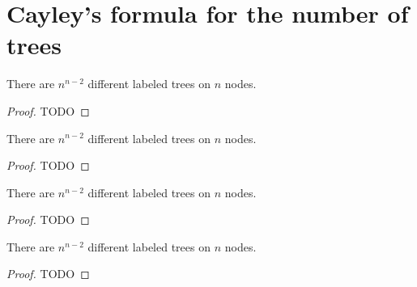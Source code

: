 \chapter{Cayley's formula for the number of trees}

\begin{theorem}
  \label{cayley_formala_proof1}
  There are $n^{n - 2}$ different labeled trees on $n$ nodes.
\end{theorem}
\begin{proof}
  TODO
\end{proof}


\begin{theorem}
  \label{cayley_formala_proof2}
  There are $n^{n - 2}$ different labeled trees on $n$ nodes.
\end{theorem}
\begin{proof}
  TODO
\end{proof}

\begin{theorem}
  \label{cayley_formala_proof3}
  There are $n^{n - 2}$ different labeled trees on $n$ nodes.
\end{theorem}
\begin{proof}
  TODO
\end{proof}


\begin{theorem}
  \label{cayley_formala_proof4}
  There are $n^{n - 2}$ different labeled trees on $n$ nodes.
\end{theorem}
\begin{proof}
  TODO
\end{proof}
